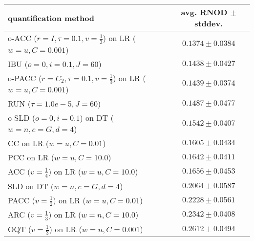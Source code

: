 \begin{tabular}{lc}
  \toprule
  quantification method & avg. RNOD $\pm$ stddev. \\
  \midrule
  o-ACC ($r=I, \tau=0.1, v=\frac{1}{3}$) on LR ($w=u, C=0.001$) & $\mathbf{0.1374 \pm 0.0384}$ \\
  IBU ($o=0, i=0.1, J=60$) & $0.1438 \pm 0.0427$ \\
  o-PACC ($r=C_2, \tau=0.1, v=\frac{1}{3}$) on LR ($w=u, C=0.001$) & $0.1439 \pm 0.0374$ \\
  RUN ($\tau=1.0e-5, J=60$) & $0.1487 \pm 0.0477$ \\
  o-SLD ($o=0, i=0.1$) on DT ($w=n, c=G, d=4$) & $0.1542 \pm 0.0407$ \\
  CC on LR ($w=u, C=0.01$) & $0.1605 \pm 0.0434$ \\
  PCC on LR ($w=u, C=10.0$) & $0.1642 \pm 0.0411$ \\
  ACC ($v=\frac{1}{4}$) on LR ($w=u, C=10.0$) & $0.1656 \pm 0.0453$ \\
  SLD on DT ($w=n, c=G, d=4$) & $0.2064 \pm 0.0587$ \\
  PACC ($v=\frac{1}{2}$) on LR ($w=u, C=0.01$) & $0.2228 \pm 0.0561$ \\
  ARC ($v=\frac{1}{3}$) on LR ($w=n, C=10.0$) & $0.2342 \pm 0.0408$ \\
  OQT ($v=\frac{1}{3}$) on LR ($w=n, C=0.001$) & $0.2612 \pm 0.0494$ \\
  \bottomrule
\end{tabular}
